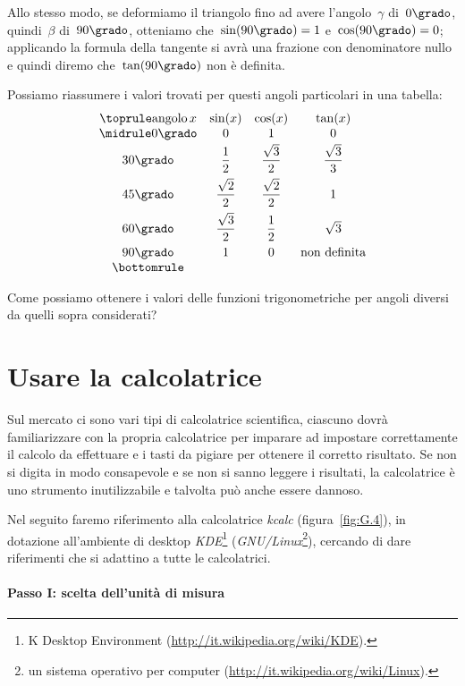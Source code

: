 Allo stesso modo, se deformiamo il triangolo fino ad avere l'angolo~$\gamma$ di~$0\grado$, quindi~$\beta$ di~$90\grado$, otteniamo
che~$\sin(90\grado)=1$ e~$\cos(90\grado)=0$; applicando la formula della tangente si avrà una frazione con denominatore nullo e
quindi diremo che~$\tan(90\grado)$ non è definita.

Possiamo riassumere i valori trovati per questi angoli particolari in una tabella:
\[
\begin{array}{cccc}
\toprule
\text{angolo}\, x & \sin(x)&\cos(x) & \tan(x)\\
\midrule
0\grado & 0 & 1 & 0\\[2pt]
30\grado & \dfrac{1}{2} & \dfrac{\sqrt{3}}{2} & \dfrac{\sqrt{3}}{3}\\[8pt]
45\grado & \dfrac{\sqrt{2}}{2} & \dfrac{\sqrt{2}}{2} & 1\\[8pt]
60\grado & \dfrac{\sqrt{3}}{2} & \dfrac{1}{2} & \sqrt{3}\\[7pt]
90\grado & 1 & 0 & \text{non definita}\\
\bottomrule
\end{array}
\]

Come possiamo ottenere i valori delle funzioni trigonometriche per angoli diversi da quelli sopra considerati?

\section{Usare la calcolatrice}

Sul mercato ci sono vari tipi di calcolatrice scientifica, ciascuno dovrà familiarizzare con la propria calcolatrice per imparare
ad impostare correttamente il calcolo da effettuare e i tasti da pigiare per ottenere il corretto risultato. Se non si digita in
modo consapevole e se non si sanno leggere i risultati, la calcolatrice è uno strumento inutilizzabile e talvolta può anche essere dannoso.

Nel seguito faremo riferimento alla calcolatrice \emph{kcalc} (figura~\ref{fig:G.4}), in dotazione all'ambiente di desktop \emph{KDE}\footnote{K Desktop Environment (\url{http://it.wikipedia.org/wiki/KDE}).} (\emph{GNU/Linux}\footnote{un sistema operativo per computer (\url{http://it.wikipedia.org/wiki/Linux}).}), cercando di dare
riferimenti che si adattino a tutte le calcolatrici.

\paragraph{Passo I: scelta dell'unità di misura}

